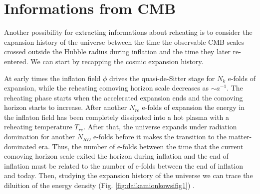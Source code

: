 \documentclass[11pt,a4paper,twoside]{book}
\begin{document}
\section{Informations from CMB}
Another possibility for extracting informations about reheating is to consider the expansion history of the universe between the time the observable CMB scales crossed outside the Hubble radius during inflation and the time they later re-entered. We can start by recapping the cosmic expansion history.

At early times the inflaton field $\phi$ drives the quasi-de-Sitter stage for $ N_{k} $ e-folds of expansion, while the reheating comoving horizon scale decreases as $ \sim a^{-1} $. The reheating phase starts when the accelerated expansion ends and the comoving horizon starts to increase. After another $ N_{re} $ e-folds of expansion the energy in the inflaton field has been completely dissipated into a hot plasma with a reheating temperature $ T_{re} $. After that, the universe expands under radiation domination for another $ N_{RD} $ e-folds before it makes the transition to the matter-dominated era. Thus, the number of e-folds between the time that the current comoving horizon scale exited the horizon during inflation and the end of inflation must be related to the number of e-folds between the end of inflation and today. Then, studying the expansion history of the universe we can trace the diluition of the energy density (Fig. \ref{fig:daikamionkowsifig1}) \cite{Chap3:Kai_Kamionkowsy}. 
\end{document}
